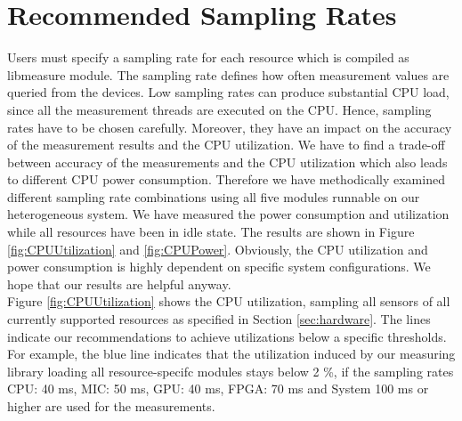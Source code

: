 %
%
%
%
%
%

\section{Recommended Sampling Rates} \label{app:A}
Users must specify a sampling rate for each resource which is compiled as libmeasure module. The sampling rate defines how often measurement values are queried from the devices. Low sampling rates can produce substantial CPU load, since all the measurement threads are executed on the CPU. Hence, sampling rates have to be chosen carefully. Moreover, they have an impact on the accuracy of the measurement results and the CPU utilization. We have to find a trade-off between accuracy of the measurements and the CPU utilization which also leads to different CPU power consumption. Therefore we have methodically examined different sampling rate combinations using all five modules runnable on our heterogeneous system.  We have measured the power consumption and utilization while all resources have been in idle state. The results are shown in Figure \ref{fig:CPUUtilization} and \ref{fig:CPUPower}. Obviously, the CPU utilization and power consumption is highly dependent on specific system configurations. We hope that our results are helpful anyway.\\

Figure \ref{fig:CPUUtilization} shows the CPU utilization, sampling all sensors of all currently supported resources as specified in Section \ref{sec:hardware}. The lines indicate our recommendations to achieve utilizations below a specific thresholds. For example, the blue line indicates that the utilization induced by our measuring library loading all resource-specifc modules stays below 2 \%, if the sampling rates CPU: 40 ms, MIC: 50 ms, GPU: 40 ms, FPGA: 70 ms and System 100 ms or higher are used for the measurements.

